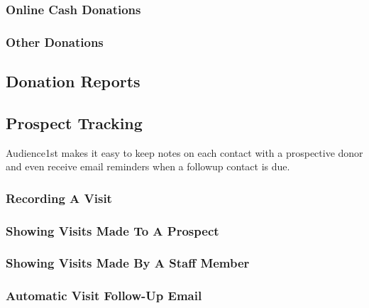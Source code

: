 \subsubsection{Online Cash Donations}
\label{sec:online_donations}


\subsubsection{Other Donations}
\label{sec:other_donations}


\subsection{Donation Reports}
\label{sec:donation_search}

\subsection{Prospect Tracking}
\label{sec:prospect_tracking}

Audience1st makes it easy to keep notes on each contact with a
prospective donor and even receive email reminders when a followup
contact is due.

\subsubsection{Recording A Visit}
\label{sec:prospect_visit}

\subsubsection{Showing Visits Made To A Prospect}

\subsubsection{Showing Visits Made By A Staff Member}

\subsubsection{Automatic Visit Follow-Up Email}

